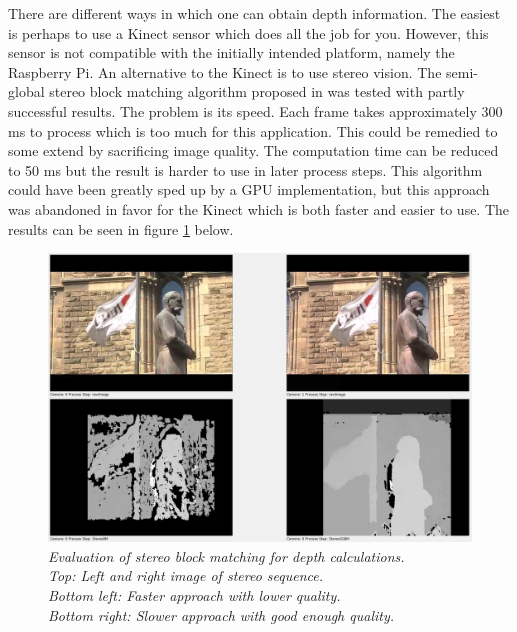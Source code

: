 
There are different ways in which one can obtain depth information. The easiest is perhaps to use a Kinect sensor which does all the job for you. However, this sensor is not compatible with the initially intended platform, namely the Raspberry Pi. An alternative to the Kinect is to use stereo vision. The semi-global stereo block matching algorithm proposed in \cite{StereoBM} was tested with partly successful results. The problem is its speed. Each frame takes approximately 300 ms to process which is too much for this application. This could be remedied to some extend by sacrificing image quality. The computation time can be reduced to 50 ms but the result is harder to use in later process steps. This algorithm could have been greatly sped up by a GPU implementation, but this approach was abandoned in favor for the Kinect which is both faster and easier to use. The results can be seen in figure \ref{fig:Stereo} below.

\vspace{1cm}
\begin{figure}[htb]
	\includegraphics[width=\linewidth]{images/stereoComp.png}
	\caption[An example of depth images calculated from a stereo sequence]{\textit{Evaluation of stereo block matching for depth calculations.\\ 
	Top: Left and right image of stereo sequence.\\ 
	Bottom left: Faster approach with lower quality.\\ 
	Bottom right: Slower approach with good enough quality.}}
	\label{fig:Stereo}  %
\end{figure}
\newpage

